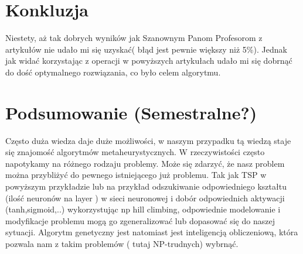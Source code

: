\documentclass[11pt]{article}
\begin{document}
\section{Konkluzja}
Niestety, aż tak dobrych wyników jak Szanownym Panom Profesorom z artykułów nie udało mi się uzyskać( błąd jest pewnie większy niż 5\%). Jednak jak widać korzystając z operacji w powyższych artykułach udało mi się dobrnąć do dość optymalnego rozwiązania, co było celem algorytmu. 
\section{Podsumowanie (Semestralne?)}
Często duża wiedza daje duże możliwości, w naszym przypadku tą wiedzą staje się znajomość algorytmów metaheurystycznych. W rzeczywistości często napotykamy na różnego rodzaju problemy. Może się zdarzyć, że nasz problem można przybliżyć do pewnego istniejącego już problemu. Tak jak TSP w powyższym przykładzie lub na przykład odszukiwanie odpowiedniego kształtu (ilość neuronów na layer ) w sieci neuronowej i dobór odpowiednich aktywacji (tanh,sigmoid,..) wykorzystując np hill climbing, odpowiednie modelowanie i modyfikacje problemu mogą go zgeneralizować lub dopasować się do naszej sytuacji. Algorytm genetyczny jest natomiast jest inteligencją obliczeniową, która pozwala nam z takim problemów ( tutaj NP-trudnych) wybrnąć.
\end{document}
